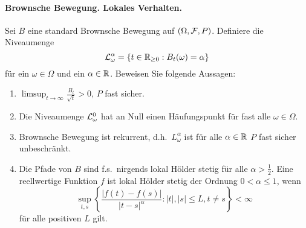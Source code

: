 \paragraph{Brownsche Bewegung. Lokales Verhalten. }
Sei $B$ eine standard Brownsche Bewegung auf $(\Omega, \mathcal F, P)$. Definiere die
Niveaumenge 
\begin{equation*}
    \mathcal L_{\omega}^{\alpha} = \left\{ t\in\mathbb R_{\geq 0} : B_t(\omega)=\alpha \right\}
\end{equation*}
für ein $\omega\in\Omega$ und ein $\alpha\in\mathbb R$. 
Beweisen Sie folgende Aussagen:
\begin{enumerate}
    \item $\limsup_{t\to \infty} \frac{B_t}{\sqrt{t}} > 0$, $P$ fast sicher. 
    \item Die Niveaumenge $\mathcal L_\omega^{0}$ hat an Null einen Häufungspunkt
        für fast alle $\omega\in \Omega$. 
    \item Brownsche Bewegung ist rekurrent, d.h.\ $L_\omega^{\alpha}$ ist für alle
        $\alpha\in\mathbb R$ $P$ fast sicher unbeschränkt. 
    \item Die Pfade von $B$ sind f.s.\ nirgends lokal Hölder stetig für alle 
        $\alpha>\frac{1}{2}$. Eine reellwertige Funktion $f$ ist lokal Hölder
        stetig der Ordnung $0<\alpha\leq 1$, wenn 
        \begin{equation*}
            \sup_{t,s} \left\{ \frac{ | f(t)-f(s) | }{ | t-s |^{\alpha}} : 
            |t|,|s| \leq L, t\neq s \right\} < \infty
        \end{equation*}
        für alle positiven $L$ gilt. 
\end{enumerate}
